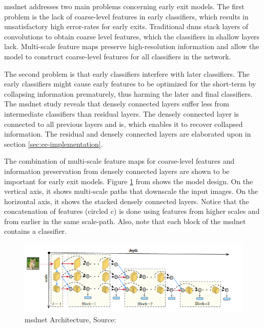 \gls{msdnet} \cite{huang_densely_2016} addresses two main problems concerning early exit models. The first problem is the lack of coarse-level features in early classifiers, which results in unsatisfactory high error-rates for early exits. Traditional \gls{dnn}s stack layers of convolutions to obtain coarse level features, which the classifiers in shallow layers lack. Multi-scale feature maps preserve high-resolution information and allow the model to construct coarse-level features for all classifiers in the network. 

The second problem is that early classifiers interfere with later classifiers. The early classifiers might cause early features to be optimized for the short-term by collapsing information prematurely, thus harming the later and final classifiers. The \gls{msdnet} \cite{huang_multi-scale_2017} study reveals that densely connected layers suffer less from intermediate classifiers than residual layers. The densely connected layer is connected to all previous layers and is, which enables it to recover collapsed information. The residual and densely connected layers are elaborated upon in section \ref{sec:ee-implementation}.

The combination of multi-scale feature maps for coarse-level features and information preservation from densely connected layers are shown to be important for early exit models. Figure \ref{fig:msdnet} from \cite{huang_multi-scale_2017} shows the model design. On the vertical axis, it shows multi-scale paths that downscale the input images. On the horizontal axis, it shows the stacked densely connected layers. Notice that the concatenation of features (circled c) is done using features from higher scales and from earlier in the same scale-path. Also, note that each block of the \gls{msdnet} contains a classifier.
\begin{figure}
	\centering
	\includegraphics[width=\linewidth]{figures/models/msdnet}
	\caption[\gls{msdnet} Architecture]{\gls{msdnet} Architecture, Source:  \cite{huang_multi-scale_2017}}
	\label{fig:msdnet}
\end{figure}

